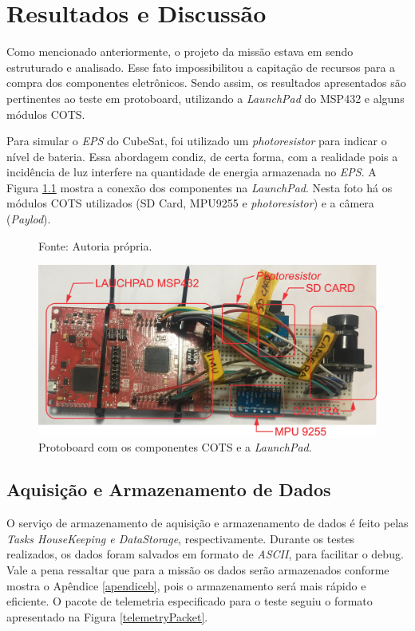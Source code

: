 \chapter[Resultados e Discussão]{Resultados e Discussão}
\label{secaoResul}
Como mencionado anteriormente, o projeto da missão estava em sendo estruturado e analisado. Esse fato impossibilitou a capitação de recursos para a compra dos componentes eletrônicos. Sendo assim, os resultados apresentados são pertinentes ao teste em protoboard, utilizando a \textit{LaunchPad} do MSP432 e alguns módulos COTS.

Para simular o \textit{EPS} do CubeSat, foi utilizado um \textit{photoresistor} para indicar o nível de bateria. Essa abordagem condiz, de certa forma, com a realidade pois a incidência de luz interfere na quantidade de energia armazenada no \textit{EPS}. A Figura \ref{protoboardCompleteDetail} mostra a conexão dos componentes na \textit{LaunchPad}. Nesta foto há os módulos COTS utilizados (SD Card, MPU9255 e \textit{photoresistor}) e a câmera (\textit{Paylod}).

\begin{figure}[h]
\footnotesize{	
	\centering
		\centering
	\footnotesize{Fonte: Autoria própria.}
	
	\includegraphics[keepaspectratio=true,scale=0.57]{figuras/protoboardCompleteDetail.png}
	\caption{Protoboard com os componentes COTS e a \textit{LaunchPad}.}
	\label{protoboardCompleteDetail}
}
\end{figure}
\FloatBarrier

\section{Aquisição e Armazenamento de Dados}

O serviço de armazenamento de aquisição e armazenamento de dados é feito pelas \textit{Tasks HouseKeeping e DataStorage}, respectivamente. Durante os testes realizados, os dados foram salvados em formato de \textit{ASCII}, para facilitar o debug. Vale a pena ressaltar que para a missão os dados serão armazenados conforme mostra o Apêndice \ref{apendiceb}, pois o armazenamento será mais rápido e eficiente. O pacote de telemetria especificado para o teste seguiu o formato apresentado na Figura \ref{telemetryPacket}.


